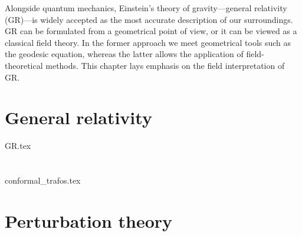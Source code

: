 







Alongside quantum mechanics, Einstein's theory of gravity---general relativity (GR)---is widely accepted as the most accurate description of our surroundings. GR can be formulated from a geometrical point of view, or it can be viewed as a classical field theory. In the former approach we meet geometrical tools such as the geodesic equation, whereas the latter allows the application of field-theoretical methods. This chapter lays emphasis on the field interpretation of GR. 






\section{General relativity}\label{sec:CFTgrav:GR}
    {{GR.tex}}







\section{}
    {{conformal_trafos.tex}}







\section{Perturbation theory}\label{sec:CFTgrav:pert}


